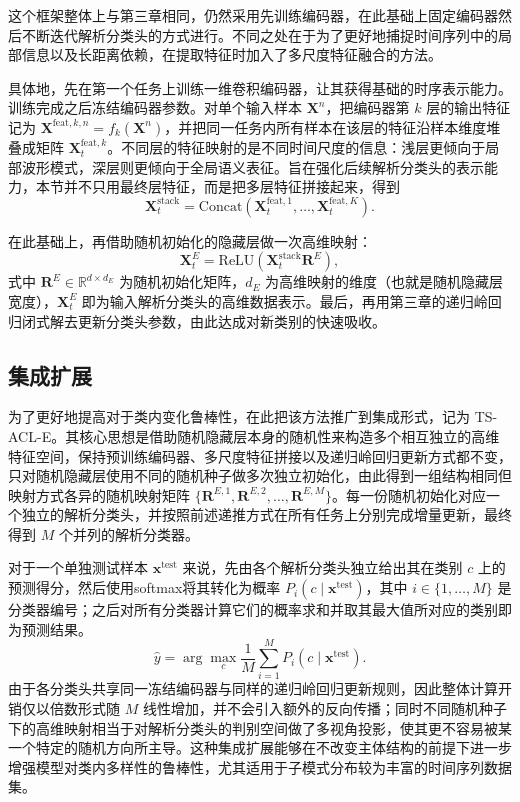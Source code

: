 这个框架整体上与第三章相同，仍然采用先训练编码器，在此基础上固定编码器然后不断迭代解析分类头的方式进行。不同之处在于为了更好地捕捉时间序列中的局部信息以及长距离依赖，在提取特征时加入了多尺度特征融合的方法。

具体地，先在第一个任务上训练一维卷积编码器，让其获得基础的时序表示能力。训练完成之后冻结编码器参数。对单个输入样本 $\mathbf{X}^{n}$，把编码器第 $k$ 层的输出特征记为 $\mathbf{X}^{\mathrm{feat},k,n}=f_k(\mathbf{X}^{n})$，并把同一任务内所有样本在该层的特征沿样本维度堆叠成矩阵 $\mathbf{X}_t^{\mathrm{feat},k}$。不同层的特征映射的是不同时间尺度的信息：浅层更倾向于局部波形模式，深层则更倾向于全局语义表征。旨在强化后续解析分类头的表示能力，本节并不只用最终层特征，而是把多层特征拼接起来，得到
\begin{equation}
\mathbf{X}_t^{\mathrm{stack}} = \mathrm{Concat}\left(\mathbf{X}_t^{\mathrm{feat},1}, \ldots, \mathbf{X}_t^{\mathrm{feat},K}\right).
\label{eq:ts_stack}
\end{equation}

在此基础上，再借助随机初始化的隐藏层做一次高维映射：
\begin{equation}
\mathbf{X}_t^{E}=\mathrm{ReLU}(\mathbf{X}_t^{\mathrm{stack}}\mathbf{R}^E),
\label{eq:ts_rhl}
\end{equation}
式中 $\mathbf{R}^E\in\mathbb{R}^{d\times d_E}$ 为随机初始化矩阵，$d_E$ 为高维映射的维度（也就是随机隐藏层宽度），$\mathbf{X}_t^E$ 即为输入解析分类头的高维数据表示。最后，再用第三章的递归岭回归闭式解去更新分类头参数，由此达成对新类别的快速吸收。

\subsection{集成扩展}

为了更好地提高对于类内变化鲁棒性，在此把该方法推广到集成形式，记为 TS-ACL-E。其核心思想是借助随机隐藏层本身的随机性来构造多个相互独立的高维特征空间，保持预训练编码器、多尺度特征拼接以及递归岭回归更新方式都不变，只对随机隐藏层使用不同的随机种子做多次独立初始化，由此得到一组结构相同但映射方式各异的随机映射矩阵 $\{\mathbf{R}^{E,1},\mathbf{R}^{E,2},\ldots,\mathbf{R}^{E,M}\}$。每一份随机初始化对应一个独立的解析分类头，并按照前述递推方式在所有任务上分别完成增量更新，最终得到 $M$ 个并列的解析分类器。

对于一个单独测试样本 $\mathbf{x}^{\mathrm{test}}$ 来说，先由各个解析分类头独立给出其在类别 $c$ 上的预测得分，然后使用softmax将其转化为概率 $P_i(c\mid \mathbf{x}^{\mathrm{test}})$，其中 $i\in\{1,\ldots,M\}$ 是分类器编号；之后对所有分类器计算它们的概率求和并取其最大值所对应的类别即为预测结果。
\begin{equation}
\hat{y}=\arg\max_{c}\frac{1}{M}\sum_{i=1}^{M}P_i(c\mid \mathbf{x}^{\mathrm{test}}).
\label{eq:tsacl_ensemble}
\end{equation}
由于各分类头共享同一冻结编码器与同样的递归岭回归更新规则，因此整体计算开销仅以倍数形式随 $M$ 线性增加，并不会引入额外的反向传播；同时不同随机种子下的高维映射相当于对解析分类头的判别空间做了多视角投影，使其更不容易被某一个特定的随机方向所主导。这种集成扩展能够在不改变主体结构的前提下进一步增强模型对类内多样性的鲁棒性，尤其适用于子模式分布较为丰富的时间序列数据集。

